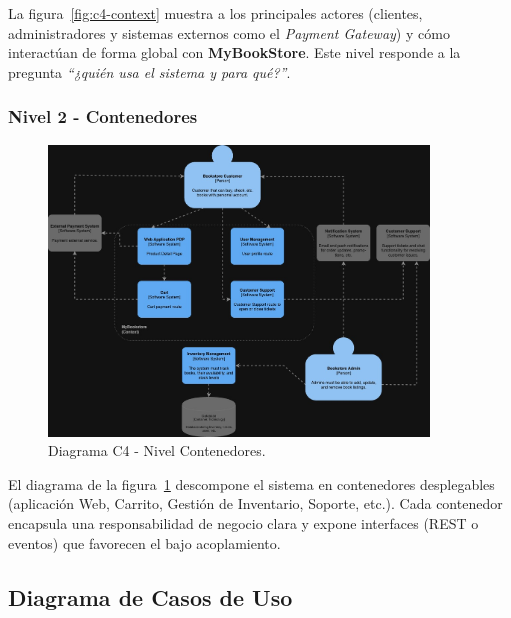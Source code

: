 La figura~\ref{fig:c4-context} muestra a los principales actores (clientes,
administradores y sistemas externos como el \emph{Payment Gateway}) y cómo
interactúan de forma global con \textbf{MyBookStore}.  
Este nivel responde a la pregunta \emph{“¿quién usa el sistema y para
qué?”}.

\subsubsection{Nivel 2 - Contenedores}

\begin{figure}[H]
  \centering
  \includegraphics[width=0.9\textwidth]{Figures/2. Architecture/Diagram-C4-Container.jpg}
  \caption{Diagrama C4 - Nivel Contenedores.}
  \label{fig:c4-container}
\end{figure}

El diagrama de la figura~\ref{fig:c4-container} descompone el sistema en
contenedores desplegables (aplicación Web, Carrito, Gestión de Inventario,
Soporte, etc.).  
Cada contenedor encapsula una responsabilidad de negocio clara y expone
interfaces (REST o eventos) que favorecen el bajo acoplamiento.

\subsection{Diagrama de Casos de Uso}

